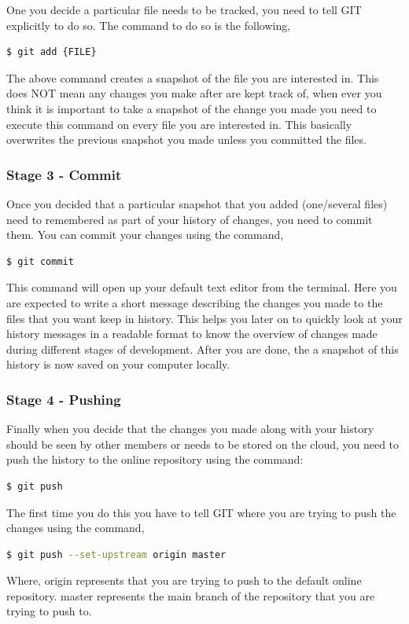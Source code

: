 \documentclass{cmc}
\begin{document}
One you decide a particular file needs to be tracked, you need to tell
GIT explicitly to do so. The command to do so is the following,

\begin{lstlisting}[language=bash]
$ git add {FILE}
\end{lstlisting}

The above command creates a snapshot of the file you are interested
in. This does NOT mean any changes you make after are kept track of,
when ever you think it is important to take a snapshot of the change
you made you need to execute this command on every file you are
interested in. This basically overwrites the previous snapshot you
made unless you committed the files.

\subsubsection{Stage 3 - Commit}
\label{sec:stage-3-commit}

Once you decided that a particular snapshot that you added
(one/several files) need to remembered as part of your history of
changes, you need to commit them.  You can commit your changes using
the command,

\begin{lstlisting}[language=bash]
$ git commit
\end{lstlisting}

This command will open up your default text editor from the
terminal. Here you are expected to write a short message describing
the changes you made to the files that you want keep in history. This
helps you later on to quickly look at your history messages in a
readable format to know the overview of changes made during different
stages of development. After you are done, the a snapshot of this
history is now saved on your computer locally.

\subsubsection{Stage 4 - Pushing}
\label{sec:stage-4-pushing}

Finally when you decide that the changes you made along with your history
should be seen by other members or needs to be stored on the cloud, you need
to push the history to the online repository using the command:

\begin{lstlisting}[language=bash]
$ git push
\end{lstlisting}

The first time you do this you have to tell GIT where you are trying to push the
changes using the command,

\begin{lstlisting}[language=bash]
$ git push --set-upstream origin master
\end{lstlisting}

Where,
origin represents that you are trying to push to the default online repository.
master represents the main branch of the repository that you are trying to push to.
\end{document}
